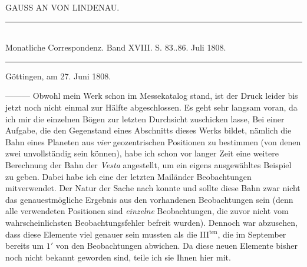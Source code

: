 \clearpage
{}
\hypertarget{native-306-lower}{}
\begin{center}GAUSS AN VON LINDENAU.
\end{center}

\begin{center}
\rule{4cm}{0.4pt}\\
\fontsize{10}{12}\selectfont Monatliche Correspondenz. Band XVIII. S. 83..86. Juli 1808.\\
\rule{4cm}{0.4pt}
\end{center}

\begin{flushright}
Göttingen, am 27. Juni 1808.
\end{flushright}

\noindent —\;—\;— Obwohl mein Werk schon im Messekatalog stand, ist der Druck leider bis jetzt noch nicht einmal zur Hälfte abgeschlossen. Es geht sehr langsam voran, da ich mir die einzelnen Bögen zur letzten Durchsicht zuschicken lasse, Bei einer Aufgabe, die den Gegenstand eines Abschnitts dieses Werks bildet, nämlich die Bahn eines Planeten aus \emph{vier} geozentrischen Positionen zu bestimmen (von denen zwei unvollständig sein können), habe ich schon vor langer Zeit eine weitere Berechnung der Bahn der \emph{Vesta} angestellt, um ein eigens ausgewähltes Beispiel zu geben. Dabei habe ich eine der letzten Mailänder Beobachtungen mitverwendet. Der Natur der Sache nach konnte und sollte diese Bahn zwar nicht das genauestmögliche Ergebnis aus den vorhandenen Beobachtungen sein (denn alle verwendeten Positionen sind \emph{einzelne} Beobachtungen, die zuvor nicht vom wahrscheinlichsten Beobachtungsfehler befreit wurden). Dennoch war abzusehen, dass diese Elemente viel genauer sein mussten als die III$^{\text{ten}}$, die im September bereits um $1'$ von den Beobachtungen abwichen. Da diese neuen Elemente bisher noch nicht bekannt geworden sind, teile ich sie Ihnen hier mit.


